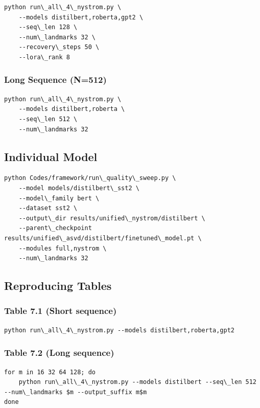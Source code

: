 \begin{lstlisting}
python run\_all\_4\_nystrom.py \
    --models distilbert,roberta,gpt2 \
    --seq\_len 128 \
    --num\_landmarks 32 \
    --recovery\_steps 50 \
    --lora\_rank 8
\end{lstlisting}

\subsubsection{Long Sequence (N=512)}

\begin{lstlisting}
python run\_all\_4\_nystrom.py \
    --models distilbert,roberta \
    --seq\_len 512 \
    --num\_landmarks 32
\end{lstlisting}

\subsection{Individual Model}

\begin{lstlisting}
python Codes/framework/run\_quality\_sweep.py \
    --model models/distilbert\_sst2 \
    --model\_family bert \
    --dataset sst2 \
    --output\_dir results/unified\_nystrom/distilbert \
    --parent\_checkpoint results/unified\_asvd/distilbert/finetuned\_model.pt \
    --modules full,nystrom \
    --num\_landmarks 32
\end{lstlisting}

\subsection{Reproducing Tables}

\subsubsection{Table 7.1 (Short sequence)}

\begin{lstlisting}
python run\_all\_4\_nystrom.py --models distilbert,roberta,gpt2
\end{lstlisting}

\subsubsection{Table 7.2 (Long sequence)}

\begin{lstlisting}
for m in 16 32 64 128; do
    python run\_all\_4\_nystrom.py --models distilbert --seq\_len 512 --num\_landmarks $m --output_suffix m$m
done
\end{lstlisting}


